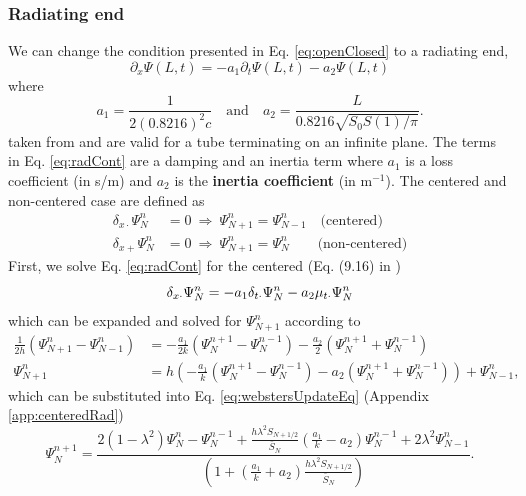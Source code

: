 \subsubsection{Radiating end}\label{sec:radiating}
We can change the condition presented in Eq. \eqref{eq:openClosed} to a radiating end,
\begin{equation}\label{eq:radCont}
    \partial_x\Psi(L,t) = -a_1\partial_t\Psi(L,t)-a_2\Psi(L,t)
\end{equation}
where \cite{theBible}
\begin{equation}
    a_1 = \frac{1}{2(0.8216)^2c} \quad \text{and} \quad a_2 = \frac{L}{0.8216\sqrt{S_0S(1)/\pi}}.
\end{equation}
taken from \cite{Atig2004} and are valid for a tube terminating on an infinite plane. The terms in Eq. \eqref{eq:radCont} are a damping and an inertia term where $a_1$ is a loss coefficient (in s/m) and $a_2$ is the \textbf{inertia coefficient} (in m$^{-1}$). The centered and non-centered case are defined as
\begin{equation}\label{eq:rightBoundaryConditions}
\begin{split}
    \delta_{x\cdot}\Psi_N^n &= 0 \ \Rightarrow \ \Psi_{N+1}^n = \Psi_{N-1}^n \quad \text{(centered)}\\
    \delta_{x+}\Psi_N^n &= 0\  \Rightarrow \ \Psi_{N+1}^n = \Psi_N^n\qquad \text{(non-centered)}
\end{split}
\end{equation}
First, we solve Eq. \eqref{eq:radCont} for the centered (Eq. (9.16) in \cite{theBible})
\begin{equation}\label{eq:centRadBound}
    \delta_{x\cdot}\Psi_N^n = -a_1\delta_{t\cdot}\Psi_N^n - a_2\mu_{t\cdot}\Psi_N^n
\end{equation}
which can be expanded and solved for $\Psi_{N+1}^n$ according to
\begin{align}
    \frac{1}{2h}(\Psi_{N+1}^n - \Psi_{N-1}^n) &= -\frac{a_1}{2k}(\Psi_N^{n+1} - \Psi_N^{n-1}) - \frac{a_2}{2}(\Psi_N^{n+1} + \Psi_N^{n-1})\nonumber\\
    \Psi_{N+1}^n &= h\left(-\frac{a_1}{k}(\Psi_N^{n+1} - \Psi_N^{n-1}) - a_2(\Psi_N^{n+1} + \Psi_N^{n-1})\right) + \Psi_{N-1}^n,
\end{align}
which can be substituted into Eq. \eqref{eq:webstersUpdateEq} (Appendix \ref{app:centeredRad}) 
\begin{equation}
    \Psi_N^{n+1} = \frac{2(1-\lambda^2)\Psi_N^n-\Psi_N^{n-1}+\frac{h\lambda^2S_{N+1/2}}{\bar S_N}\left(\frac{a_1}{k}-a_2\right)\Psi_N^{n-1} + 2\lambda^2\Psi_{N-1}^n}{\left(1+\left(\frac{a_1}{k}+a_2\right)\frac{h\lambda^2S_{N+1/2}}{\bar S_N}\right)}.
\end{equation}
